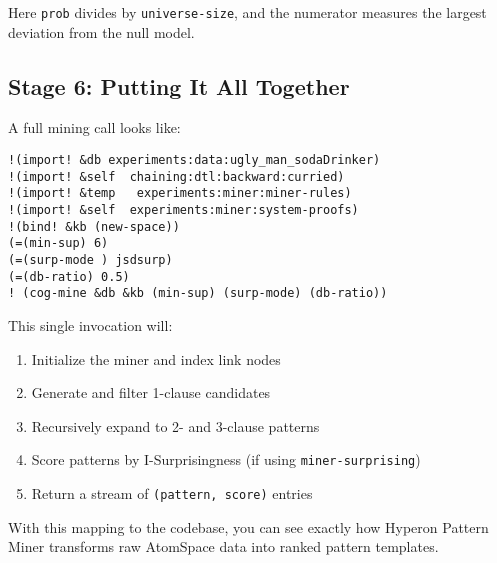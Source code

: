 \documentclass{article}
\begin{document}
Here \texttt{prob} divides by \texttt{universe-size}, and the numerator measures the largest deviation from the null model.

\subsection{Stage 6: Putting It All Together}

A full mining call looks like:

\begin{verbatim}
!(import! &db experiments:data:ugly_man_sodaDrinker)
!(import! &self  chaining:dtl:backward:curried)
!(import! &temp   experiments:miner:miner-rules)
!(import! &self  experiments:miner:system-proofs)
!(bind! &kb (new-space))
(=(min-sup) 6)
(=(surp-mode ) jsdsurp)
(=(db-ratio) 0.5)
! (cog-mine &db &kb (min-sup) (surp-mode) (db-ratio))
\end{verbatim}

This single invocation will:

\begin{enumerate}
  \item Initialize the miner and index link nodes
  \item Generate and filter 1-clause candidates
  \item Recursively expand to 2- and 3-clause patterns
  \item Score patterns by I-Surprisingness (if using \texttt{miner-surprising})
  \item Return a stream of \texttt{(pattern, score)} entries
\end{enumerate}

With this mapping to the codebase, you can see exactly how Hyperon Pattern Miner transforms raw AtomSpace data into ranked pattern templates.
\end{document}
